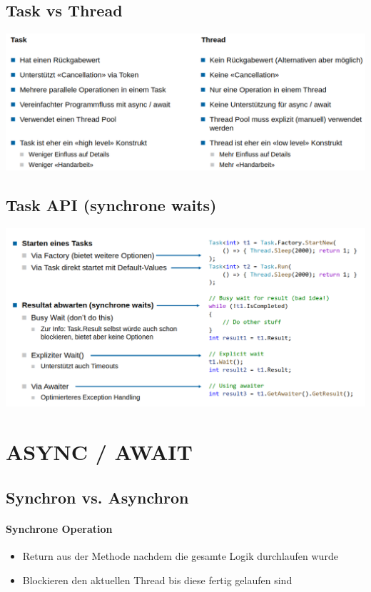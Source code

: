 \documentclass[
a4paper,
oneside,
10pt,
fleqn,
headsepline,
toc=listofnumbered, 
bibliography=totocnumbered]{scrartcl}
\let\stdsection\section
\renewcommand\section{\clearpage\stdsection}
\begin{document}
\subsection{Task vs Thread}
\begin{minipage}[t]{1\textwidth}
\centering
\includegraphics[width=1\linewidth]{MsTe/images/task_vs_thread.png}
\end{minipage}
\subsection{Task API (synchrone waits)}
\begin{minipage}[t]{1\textwidth}
\centering
\includegraphics[width=1\linewidth]{MsTe/images/task-api.png}
\end{minipage}

\section{ASYNC / AWAIT}
\subsection{Synchron vs. Asynchron}
\paragraph{Synchrone Operation}
\begin{itemize}
    \item Return aus der Methode nachdem die gesamte Logik durchlaufen wurde 
    \item Blockieren den aktuellen Thread bis diese fertig gelaufen sind 
\end{itemize}
\end{document}
